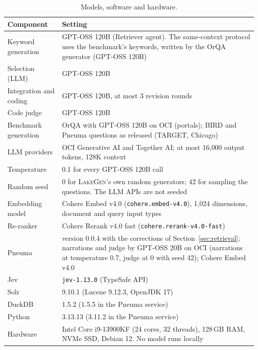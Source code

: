 \begin{table}[t]
\caption{Models, software and hardware.}
\label{tab:setup}
\centering
\small
\begin{tabular}{lp{7.6cm}}
\hline
Component & Setting \\
\hline
Keyword generation & GPT-OSS 120B (Retriever agent). The same-context protocol uses the benchmark's keywords, written by the OrQA generator (GPT-OSS 120B) \\
Selection (LLM) & GPT-OSS 120B \\
Integration and coding & GPT-OSS 120B, at most 3 revision rounds \\
Code judge & GPT-OSS 120B \\
Benchmark generation & OrQA with GPT-OSS 120B on OCI (portals); BIRD and Pneuma questions as released (TARGET, Chicago) \\
LLM providers & OCI Generative AI and Together AI; at most 16{,}000 output tokens, 128K context \\
Temperature & 0.1 for every GPT-OSS 120B call \\
Random seed & 0 for \textsc{LakeGen}'s own random generators; 42 for sampling the questions. The LLM APIs are not seeded \\
Embedding model & Cohere Embed v4.0 (\texttt{cohere.embed-v4.0}), 1{,}024 dimensions, document and query input types \\
Re-ranker & Cohere Rerank v4.0 fast (\texttt{cohere.rerank-v4.0-fast}) \\
Pneuma & version 0.0.4 with the corrections of Section~\ref{sec:retrieval}; narrations and judge by GPT-OSS 20B on OCI (narrations at temperature 0.7, judge at 0 with seed 42); Cohere Embed v4.0 \\
Jev & \texttt{jev-1.13.0} (TypeSafe API) \\
Solr & 9.10.1 (Lucene 9.12.3, OpenJDK 17) \\
DuckDB & 1.5.2 (1.5.5 in the Pneuma service) \\
Python & 3.13.13 (3.11.2 in the Pneuma service) \\
Hardware & Intel Core i9-13900KF (24 cores, 32 threads), 128\,GB RAM, NVMe SSD, Debian 12. No model runs locally \\
\hline
\end{tabular}
\end{table}


